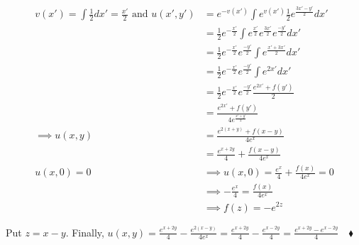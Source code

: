 \documentclass{article}
\begin{document}
\begin{align*}v(x') = \int \frac{1}{2} dx' = \frac{x'}{2}\text{ and } u(x',y') &=
                                                                                 e^{-v(x')} \int e^{v(x')}\frac{1}{2}e^{\frac{3x'-y'}{2}} dx'\\
  &=
    \frac{1}{2}e^{-\frac{x'}{2}} \int
    e^{\frac{x'}{2}}e^{\frac{3x'}{2}}e^{\frac{-y'}{2}} dx'\\
  &= \frac{1}{2}e^{-\frac{x'}{2}}e^{\frac{-y'}{2}} \int
    e^{\frac{x'+3x'}{2}} dx'\\
                                                                               &= \frac{1}{2}e^{-\frac{x'}{2}}e^{\frac{-y'}{2}} \int e^{2x'} dx'\\
  &= \frac{1}{2}e^{-\frac{x'}{2}}e^{\frac{-y'}{2}}
    \frac{e^{2x'}+f(y')}{2}\\
                                                                               &=  \frac{e^{2x'}+f(y')}{4e^{\frac{x'+y'}{2}}}\\
  \implies u(x,y)  &=  \frac{e^{2(x+y)}+f(x-y)}{4e^{x}}\\
                                                                               &=
                                                                                 \frac{e^{x+2y}}{4}+
                                                                                 \frac{f(x-y)}{4e^x}\\
  u(x,0) = 0 &\implies u(x,0) = \frac{e^{x}}{4}+
                                                                                 \frac{f(x)}{4e^x}
               = 0\\
                                                                               &\implies -\frac{e^{x}}{4} = \frac{f(x)}{4e^x}\\
                                                                               &\implies
                                                                                 f(z)=
                                                                                 -e^{2z}
\end{align*}

Put $z = x-y$. Finally, $u(x,y) = \frac{e^{x+2y}}{4}-\frac{e^{2(x-y)}}{4e^x}
=\frac{e^{x+2y}}{4}-\frac{e^{x-2y}}{4} =
\frac{e^{x+2y}-e^{x-2y}}{4}\quad \blacklozenge$
\end{document}
